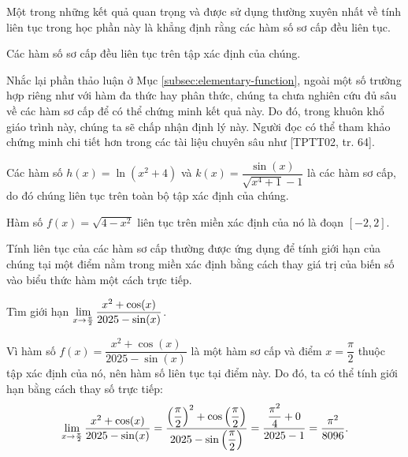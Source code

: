 Một trong những kết quả quan trọng và được sử dụng thường xuyên nhất về tính liên tục trong học phần này là khẳng định rằng các hàm số sơ cấp đều liên tục.

\begin{theorem}
	\label{thm:continuity_of_elementary_functions}
	Các hàm số sơ cấp đều liên tục trên tập xác định của chúng.
\end{theorem}

Nhắc lại phần thảo luận ở Mục \ref{subsec:elementary-function}, ngoài một số trường hợp riêng như với hàm đa thức hay phân thức, chúng ta chưa nghiên cứu đủ sâu về các hàm sơ cấp để có thể chứng minh kết quả này. Do đó, trong khuôn khổ giáo trình này, chúng ta sẽ chấp nhận định lý này. Người đọc có thể tham khảo chứng minh chi tiết hơn trong các tài liệu chuyên sâu như [TPTT02, tr. 64].

\begin{example}
	Các hàm số \( h(x) = \ln(x^2 + 4) \) và \( k(x) = \dfrac{\sin(x)}{\sqrt{x^4 + 1} - 1} \) là các hàm sơ cấp, do đó chúng liên tục trên toàn bộ tập xác định của chúng.
\end{example}

\begin{example}
	Hàm số \( f(x) = \sqrt{4 - x^2} \) liên tục trên miền xác định của nó là đoạn \( [-2, 2] \).
\end{example}

Tính liên tục của các hàm sơ cấp thường được ứng dụng để tính giới hạn của chúng tại một điểm nằm trong miền xác định bằng cách thay giá trị của biến số vào biểu thức hàm một cách trực tiếp.

\begin{example}
	Tìm giới hạn \( \lim\limits_{x \to \frac{\pi}{2}} \dfrac{x^2 + \cos(x)}{2025 - \sin(x)} \).
	\begin{solution}
		Vì hàm số \( f(x) = \dfrac{x^2 + \cos(x)}{2025 - \sin(x)} \) là một hàm sơ cấp và điểm \( x = \dfrac{\pi}{2} \) thuộc tập xác định của nó, nên hàm số liên tục tại điểm này. Do đó, ta có thể tính giới hạn bằng cách thay số trực tiếp:
		\[
		\lim\limits_{x \to \frac{\pi}{2}} \dfrac{x^2 + \cos(x)}{2025 - \sin(x)} = \dfrac{\left(\dfrac{\pi}{2}\right)^2 + \cos\left(\dfrac{\pi}{2}\right)}{2025 - \sin\left(\dfrac{\pi}{2}\right)} = \dfrac{\dfrac{\pi^2}{4} + 0}{2025 - 1} = \dfrac{\pi^2}{8096}.
		\]
	\end{solution}
\end{example}

